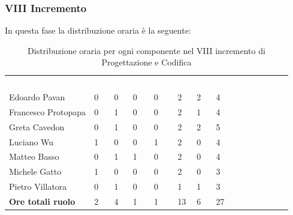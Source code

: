 \subsubsection{VIII Incremento}
In questa fase la distribuzione oraria è la seguente:
\begin{table}[H]
\begin{center}
\renewcommand{\arraystretch}{1.25}
\begin{tabular}{ m{}<{\centering}  m{}<{\centering} m{}<{\centering} m{}<{\centering}  m{}<{\centering}  m{}<{\centering}  m{}<{\centering}  m{}<{\centering}   }
	\rowcolor{darkblue}
	\textcolor{white}{\textbf{Componente}} &\textcolor{white}{\textbf{Re}}&\textcolor{white}{\textbf{Pt}}&\textcolor{white}{\textbf{An}}&\textcolor{white}{\textbf{Am}}&\textcolor{white}{\textbf{Pr}}&\textcolor{white}{\textbf{Ve}}&\textcolor{white}{\textbf{Ore complessive}}\\ 
	Edoardo Pavan & 0 & 0 & 0 & 0 & 2 & 2 & 4 \\	
	
	Francesco Protopapa & 0 & 1 & 0 & 0 & 2 & 1 & 4 \\

	Greta Cavedon & 0 & 1 & 0 & 0 & 2 & 2 & 5 \\
	
	Luciano Wu & 1 & 0 & 0 & 1 & 2 & 0 & 4 \\
	
	Matteo Basso & 0 & 1 & 1 & 0 & 2 & 0 & 4 \\
	
	Michele Gatto & 1 & 0 & 0 & 0 & 2 & 0 & 3 \\
	
	Pietro Villatora & 0 & 1 & 0 & 0 & 1 & 1 & 3 \\
	
	\textbf{Ore totali ruolo} & 2 & 4 & 1 & 1 & 13 & 6 & 27 \\

\end{tabular}
\caption{Distribuzione oraria per ogni componente nel VIII incremento di Progettazione e Codifica}
\end{center}
\end{table}

